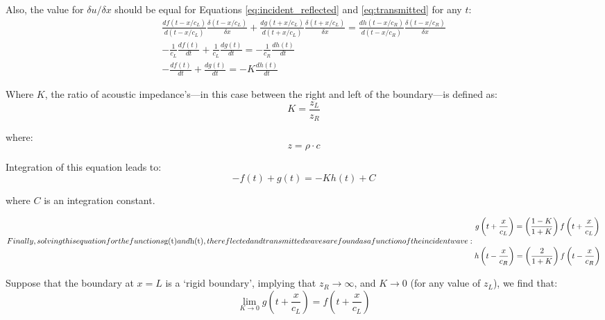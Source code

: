Also, the value for $\delta u/\delta x$ should be equal for Equations \ref{eq:incident_reflected} and \ref{eq:transmitted} for any $t$:
\begin{subequations}
\begin{gather}
    \frac{df(t-x/c_L)}{d(t-x/c_L)}\frac{\delta(t-x/c_L)}{\delta x} + \frac{dg(t+x/c_L)}{d(t+x/c_L)}\frac{\delta(t+x/c_L)}{\delta x} = \frac{dh(t-x/c_R)}{d(t-x/c_R)}\frac{\delta(t-x/c_R)}{\delta x}
    \\[1em]
    -\frac{1}{c_L}\frac{df(t)}{dt} + \frac{1}{c_L}\frac{dg(t)}{dt} = -\frac{1}{c_R}\frac{dh(t)}{dt}
    \\[1em]
    -\frac{df(t)}{dt} + \frac{dg(t)}{dt} = -K \frac{dh(t)}{dt}
\end{gather}
\end{subequations}

Where $K$, the ratio of acoustic impedance's---in this case between the right and left of the boundary---is defined as:
\begin{equation}
    K = \frac{z_L}{z_R}
\end{equation}

where:
\begin{equation}
    z=\rho\cdot c
    \label{Eq:Acoustic_impedance}
\end{equation}

Integration of this equation leads to:
\begin{equation}
    -f(t) + g(t) = -K h(t) + C
\end{equation}

where $C$ is an integration constant.

\begin{subequations}
Finally, solving this equation for the functions $g(t)$ and $h(t)$, the reflected and transmitted waves are found as a function of the incident wave:
    \begin{gather}
        g\left(t + \frac{x}{c_L}\right) = \left(\frac{1-K}{1+K}\right) f\left(t + \frac{x}{c_L}\right)
        \\[1em]
        h\left(t - \frac{x}{c_R}\right) = \left(\frac{2}{1+K}\right) f\left(t - \frac{x}{c_R}\right)
    \end{gather}
    \label{Eq:Reflections}
\end{subequations}

Suppose that the boundary at $x=L$ is a `rigid boundary', implying that $z_R\rightarrow \infty$, and $K\rightarrow 0$ (for any value of $z_L$), we find that:
\begin{equation}
    \lim_{K \to 0} g\left(t + \frac{x}{c_L}\right) = f\left(t + \frac{x}{c_L}\right)
\end{equation}

